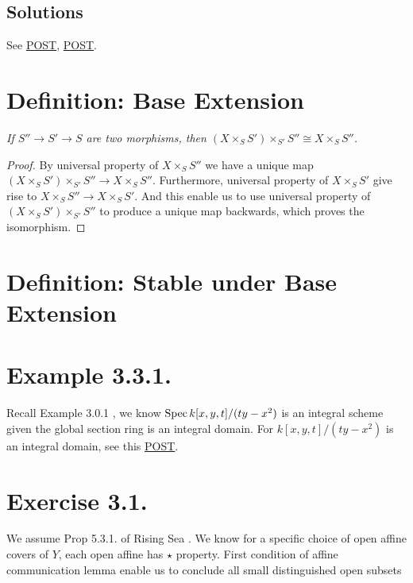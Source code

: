     
\subsection{Solutions}

See \href{https://math.stackexchange.com/questions/442911/glueing-morphisms-of-sheaves-together-can-i-just-do-this}{POST}, \href{https://math.stackexchange.com/questions/1173973/morphism-of-ringed-spaces-glue}{POST}.

\section{Definition: Base Extension}

\textit{If $S''\to S'\to S$ are two morphisms, then $(X\times_S S')\times _{S'}S''\cong X\times_{S}S''$.}
\begin{proof}
By universal property of $X\times_S S''$ we have a unique map $(X\times_S S')\times _{S'}S''\to X\times_{S}S''$. Furthermore, universal property of $X\times_S S'$ give rise to $X\times_S S''\to X\times_S S'$. And this enable us to use universal property of $(X\times_S S')\times_{S'}S''$ to produce a unique map backwards, which proves the isomorphism.
\end{proof}

\section{Definition: Stable under Base Extension}

\section{Example 3.3.1.}

Recall Example 3.0.1 , we know $\operatorname{Spec} k[x,y,t]/(ty-x^2)$ is an integral scheme given the global section ring is an integral domain.
For $k[x,y,t]/(ty-x^2)$ is an integral domain, see this \href{https://math.stackexchange.com/questions/3320367/mathbbcx-y-z-xy-z2-is-not-a-field}{POST}. 

\section{Exercise 3.1.}

We assume Prop 5.3.1. of Rising Sea \cite{RaviRisingSea}. We know for a specific choice of open affine covers of $Y$, each open affine has $\star$ property. First condition of affine communication lemma enable us to conclude all small distinguished open subsets

